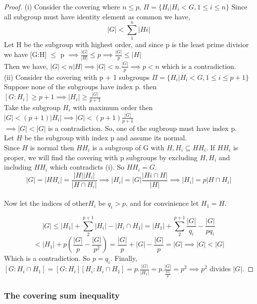 \documentclass[12pt, a4paper]{article}
\theoremstyle{plain}
\theoremstyle{definition}
\begin{document}
\begin{proof}
  (i) Consider the covering where $ n \leq p$, $\Pi = \{H_i|H_i<G, 1 \leq i \leq n\}$
  Since all subgroup must have identity element as common we have,
  \[
     |G| < \sum_{1}^{n} |Hi|\]
     Let H be the subgroup with highest order, and since p is the least prime divisior we have
     [G:H] $\leq$ p  $\implies \frac{|G|}{|H|} \leq p \implies  \frac{|G|}{p} \leq |H|$\\ 
     Then we have, $|G| < n|H| \implies |G|<n.\frac{|G|}{p} \implies p < n$ which is a contradiction.\\ 
  (ii) Consider the covering with p + 1 subgroups  $\Pi = \{H_i|H_i<G, 1 \leq i \leq p+1 \}$ \\
  Suppose none of the subgroups have index p. then $[G:H_i] \geq p+1 \implies |H_i| \geq \frac{|G|}{p+1}$\\ 
  Take the subgroup $H_i$ with maximum order then $|G| < (p+1)|H_i| \implies |G| < (p+1) \frac{|G|}{p+1}$\\ 
  $\implies |G| < |G| $ is a contradiction. So, one of the sugbroup must have index p.\\ 
  Let $H$ be the subgroup with index p and assume its normal.\\ 
  Since $H$ is normal then $HH_i$ is a subgroup of G with $H,H_i \subseteq HH_i$. If $HH_i$ is proper, we will find the covering with p subgroups by excluding $H, H_i$ and including $HH_i$ which contradicts (i). So $HH_i = G$.\\ 
  
  
  $$|G|=|HH_i|=\frac{|H||H_i|}{|H\cap H_i|} \implies |H_i|=|G| \frac{|Hi \cap H|}{|H|} \implies |H_i|= p|H \cap H_i|  $$\\ 
  Now let the indices of other$ H_i$ be $q_i > p$, and for convinience let $H_1 = H $.
  
   $$ |G| \leq |H_1| + \sum_{2}^{p+1} |H_i|- |H_i \cap H_1| = |H_1| + \sum_{2}^{p+1} \frac{|G|}{q_i} - \frac{|G|}{pq_i}$$
   $$ < |H_1| + p (\frac{|G|}{p} - \frac{|G|}{p^2}) = \frac{|G|}{p} +|G| - \frac{|G|}{p} =|G| \implies |G|<|G|  $$
   Which is a contradiction. So $p = q_i$. 
   Finally, $[G:H_i \cap H_1] = [G:H_i][H_i:H_i \cap H_1] = p.\frac{|G|}{|H_1|} = p.\frac {|G|} {\frac{|G|}{p}} = p^2 \implies p^2 $ divides $|G|$. 
  
\end{proof}

\subsubsection{The covering sum inequality}
\end{document}
